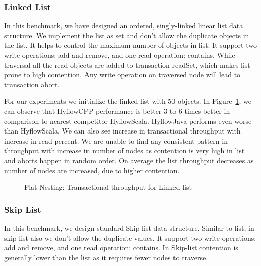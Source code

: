 \documentclass[12pt,english]{report}
\begin{document}
\subsubsection{Linked List}

In this benchmark, we have designed an ordered, singly-linked linear list data structure. We implement the list as set and don't allow the duplicate objects in the list. It helps to control the maximum number of objects in list. It support two write operations: add and remove, and one read operation: contains. While traversal all the read objects are added to transaction readSet, which makes list prone to high contention. Any write operation on traversed node will lead to transaction abort.

For our experiments we initialize the linked list with 50 objects. In Figure~\ref{Fig:flatList}, we can observe that HyflowCPP performance is better 3 to 6 times better in comparison to nearest competitor HyflowScala. HyflowJava performs even worse than HyflowScala. We can also see increase in transactional throughput with increase in read percent. We are unable to find any consistent pattern in throughput with increase in number of nodes as contention is very high in list and aborts happen in random order. On average the list throughput decreases as number of nodes are increased, due to higher contention.


\begin{figure}[H]
\centering
{}
\end{figure}
\begin{figure}[H]
\centering
{}
\end{figure}
\begin{figure}[H]
\centering
{}
\caption{Flat Nesting: Transactional throughput for Linked list}
\label{Fig:flatList}
\end{figure}

\subsubsection{Skip List}

In this benchmark, we design standard Skip-list data structure. Similar to list, in skip list also we don't allow the duplicate values. It support two write operations: add and remove, and one read operation: contains. In Skip-list contention is generally lower than the list as it requires fewer nodes to traverse. 
\end{document}

